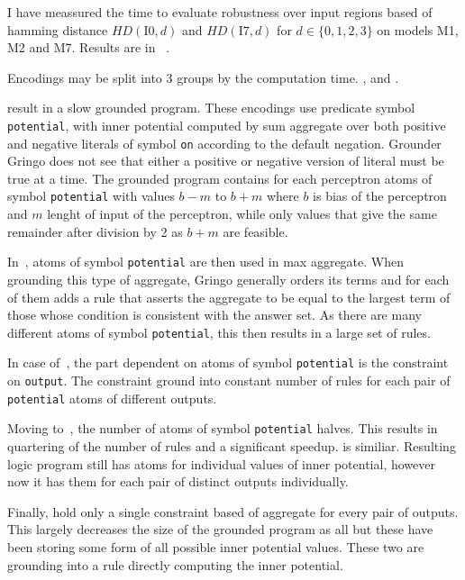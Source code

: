 I have meassured the time to evaluate robustness over input regions
based of hamming distance $HD(\text{I0}, d)$ and $HD(\text{I7}, d)$
for $d\in\{0,1,2,3\}$ on models M1, M2 and M7. Results are in%
~.

Encodings may be split into 3 groups by the computation time.
, 
and .

 result in a slow grounded program.
These encodings use predicate symbol \texttt{potential}, with inner potential
computed by sum aggregate over both positive and negative literals of symbol
\texttt{on} according to the default negation. Grounder Gringo does not see
that either a positive or negative version of literal must be true at a time.
The grounded program contains for each perceptron atoms of symbol \texttt{potential}
with values $b-m$ to $b+m$ where $b$ is bias of the perceptron and $m$ lenght of
input of the perceptron, while only values that give the same remainder after division
by 2 as $b+m$ are feasible.

In~, atoms of symbol \texttt{potential} are then used in
max aggregate. When grounding this type of aggregate, Gringo generally orders
its terms and for each of them adds a rule that asserts the aggregate to be
equal to the largest term of those whose condition is consistent with the answer set.
As there are many different atoms of symbol \texttt{potential}, this then results
in a large set of rules.

In case of~, the part dependent on atoms of symbol
\texttt{potential} is the constraint on \texttt{output}. The constraint ground into
constant number of rules for each pair of \texttt{potential} atoms of different outputs.

Moving to~, the number of atoms of symbol
\texttt{potential} halves. This results in quartering of the number of rules
and a significant speedup.  is similiar.
Resulting logic program still has atoms for individual values of inner potential,
however now it has them for each pair of distinct outputs individually.

Finally,  hold only a single
constraint based of aggregate for every pair of outputs. This largely
decreases the size of the grounded program as all but these have been storing
some form of all possible inner potential values. These two are grounding into a rule
directly computing the inner potential.

